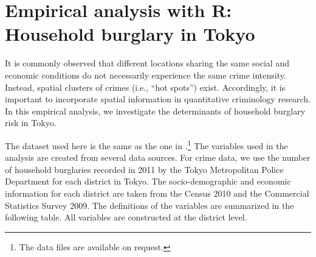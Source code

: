 \documentclass[11pt, A4paper, openany, uplatex]{book}
\begin{document}
\section{Empirical analysis with \textbf{R}: Household burglary in Tokyo}\label{sec:emp_burglar}

It is commonly observed that different locations sharing the same social and economic conditions do not necessarily experience the same crime intensity.
Instead, spatial clusters of crimes (i.e., ``hot spots'') exist.
Accordingly, it is important to incorporate spatial information in quantitative criminology research.
In this empirical analysis, we investigate the determinants of household burglary risk in Tokyo.

The dataset used here is the same as the one in \cite{hoshino2018semiparametric}.\footnote{
	The data files are available on request.
}
The variables used in the analysis are created from several data sources.
For crime data, we use the number of household burglaries recorded in 2011 by the Tokyo Metropolitan Police Department for each district in Tokyo.
The socio-demographic and economic information for each district are taken from the Census 2010 and the Commercial Statistics Survey 2009.
The definitions of the variables are summarized in the following table.
All variables are constructed at the district level.
\end{document}
